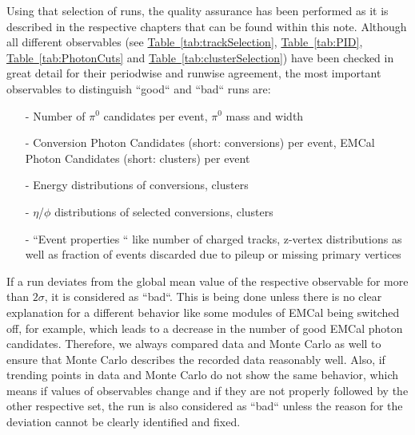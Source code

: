 Using that selection of runs, the quality assurance has been performed as it is described in the respective chapters that can be found within this note. Although all different observables (see \hyperref[tab:trackSelection]{Table~\ref*{tab:trackSelection}},  \hyperref[tab:PID]{Table~\ref*{tab:PID}}, \hyperref[tab:PhotonCuts]{Table~\ref*{tab:PhotonCuts}} and \hyperref[tab:clusterSelection]{Table~\ref*{tab:clusterSelection}}) have been checked in great detail for their periodwise and runwise agreement, the most important observables to distinguish ``good`` and ``bad`` runs are: \vspace{-0.2cm}
\begin{itemize}
\item[-] Number of $\pi^{0}$ candidates per event, $\pi^{0}$ mass and width \vspace{-0.3cm}
\item[-] Conversion Photon Candidates (short: conversions) per event, \acs{EMCal} Photon Candidates (short: clusters) per event \vspace{-0.3cm}
\item[-] Energy distributions of conversions, clusters \vspace{-0.3cm}
\item[-] $\eta$/$\phi$ distributions of selected conversions, clusters \vspace{-0.3cm}
\item[-] ``Event properties `` like number of charged tracks, z-vertex distributions as well as fraction of events discarded due to pileup or missing primary vertices \vspace{-0.2cm}
\end{itemize}
If a run deviates from the global mean value of the respective observable for more than $2\sigma$, it is considered as ``bad``. This is being done unless there is no clear explanation for a different behavior like some modules of \acs{EMCal} being switched off, for example, which leads to a decrease in the number of good \acs{EMCal} photon candidates. Therefore, we always compared data and Monte Carlo as well to ensure that Monte Carlo describes the recorded data reasonably well. Also, if trending points in data and Monte Carlo do not show the same behavior, which means if values of observables change and if they are not properly followed by the other respective set, the run is also considered as ``bad`` unless the reason for the deviation cannot be clearly identified and fixed.
%
